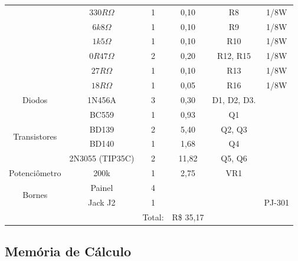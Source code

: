 \documentclass[a4paper,12pt,oneside,openany,table,xcdraw]{article}
\begin{document}
\begin{table}[H]
{\begin{tabular}{cc|c|c|cc}
\multicolumn{1}{|c|}{} & $330R \Omega$ & 1 & 0,10 & \multicolumn{1}{c|}{R8} & \multicolumn{1}{c|}{1/8W} \\ \cline{2-6} 
\multicolumn{1}{|c|}{} & $6k8 \Omega$ & 1 & 0,10 & \multicolumn{1}{c|}{R9} & \multicolumn{1}{c|}{1/8W} \\ \cline{2-6} 
\multicolumn{1}{|c|}{} & $1k5 \Omega$ & 1 & 0,10 & \multicolumn{1}{c|}{R10} & \multicolumn{1}{c|}{1/8W} \\ \cline{2-6} 
\multicolumn{1}{|c|}{} & $0R47 \Omega$ & 2 & 0,20 & \multicolumn{1}{c|}{R12, R15} & \multicolumn{1}{c|}{1/8W} \\ \cline{2-6} 
\multicolumn{1}{|c|}{} & $27R \Omega$ & 1 & 0,10 & \multicolumn{1}{c|}{R13} & \multicolumn{1}{c|}{1/8W} \\ \cline{2-6} 
\multicolumn{1}{|c|}{} & $18R \Omega$ & 1 & 0,05 & \multicolumn{1}{c|}{R16} & \multicolumn{1}{c|}{1/8W} \\ \hline
\multicolumn{1}{|c|}{Diodos} & 1N456A & 3 & 0,30 & \multicolumn{1}{c|}{D1, D2, D3.} & \multicolumn{1}{c|}{} \\ \hline
\multicolumn{1}{|c|}{\multirow{4}{*}{Transistores}} & BC559 & 1 & 0,93 & \multicolumn{1}{c|}{Q1} & \multicolumn{1}{c|}{} \\ \cline{2-6} 
\multicolumn{1}{|c|}{} & BD139 & 2 & 5,40 & \multicolumn{1}{c|}{Q2, Q3} & \multicolumn{1}{c|}{} \\ \cline{2-6} 
\multicolumn{1}{|c|}{} & BD140 & 1 & 1,68 & \multicolumn{1}{c|}{Q4} & \multicolumn{1}{c|}{} \\ \cline{2-6} 
\multicolumn{1}{|c|}{} & 2N3055 (TIP35C) & 2 & 11,82 & \multicolumn{1}{c|}{Q5, Q6} & \multicolumn{1}{c|}{} \\ \hline
\multicolumn{1}{|c|}{Potenciômetro} & 200k & 1 & 2,75 & \multicolumn{1}{c|}{VR1} & \multicolumn{1}{c|}{} \\ \hline
\multicolumn{1}{|c|}{\multirow{2}{*}{Bornes}} & Painel & 4 &  & \multicolumn{1}{c|}{} & \multicolumn{1}{c|}{} \\ \cline{2-6} 
\multicolumn{1}{|c|}{} & Jack J2 & 1 &  & \multicolumn{1}{c|}{} & \multicolumn{1}{c|}{PJ-301} \\ \hline
\multicolumn{1}{l}{} &  & Total: & R\$  35,17 &  &  \\ \cline{3-4}
\end{tabular}%
}
\end{table}

\subsection{Memória de Cálculo}
\end{document}
